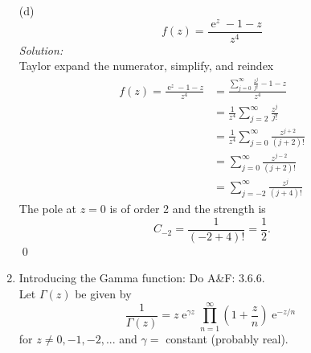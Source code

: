 \documentclass[10pt]{amsart}
\DeclareMathOperator{\E}{e}
\theoremstyle{nonumberplain}
\begin{document}
\begin{enumerate}[label={\bf {\arabic*}:}]
\noindent
(d)
$$
f(z) = \frac {\E^z - 1 - z}{z^4}
$$
\textit{Solution:} \\
Taylor expand the numerator, simplify, and reindex
\begin{align*}
f(z) = \frac {\E^z - 1 - z}{z^4} &= \frac {\sum_{j=0}^\infty \frac {z^j} {j!} - 1 - z}{z^4} \\
	&= \frac 1 {z^4} \sum_{j=2}^\infty \frac {z^j} {j!} \\
	&= \frac 1 {z^4} \sum_{j=0}^\infty \frac {z^{j + 2}} {(j + 2)!} \\
	&= \sum_{j=0}^\infty \frac {z^{j - 2}} {(j + 2)!} \\
	&= \sum_{j=-2}^\infty \frac {z^{j}} {(j + 4)!}
\end{align*}
The pole at $z = 0$ is of order 2 and the strength is
$$
C_{-2} = \frac 1 {(-2 + 4)!} = \frac 1 2.
$$
\qed \\
\newpage

\item Introducing the Gamma function: Do A\&F: 3.6.6. \\

\noindent
Let $\Gamma(z)$ be given by
$$
\frac 1 {\Gamma(z)} = z \E^{\gamma z} \prod_{n=1}^\infty \left( 1 + \frac z n \right) \E^{-z / n}
$$
for $z \neq 0, -1, -2, ...$ and $\gamma = $ constant (probably real). \\


\end{enumerate}
\end{document}
